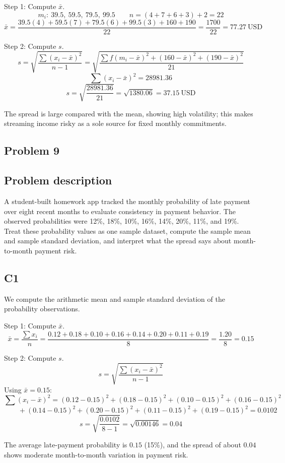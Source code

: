 \begin{ExamProblems}
		Step 1: Compute $\bar{x}$.
		\[
		m_i:\ 39.5,\ 59.5,\ 79.5,\ 99.5
		\qquad
		n = (4+7+6+3)+2 = 22
		\]
		\[
		\bar{x} = \frac{39.5(4)+59.5(7)+79.5(6)+99.5(3)+160+190}{22}
		= \frac{1700}{22}
		= 77.27\ \text{USD}
		\]

		Step 2: Compute $s$.
		\[
		s = \sqrt{\frac{\sum (x_i-\bar{x})^2}{n-1}}
		= \sqrt{\frac{\sum f(m_i-\bar{x})^2 + (160-\bar{x})^2 + (190-\bar{x})^2}{21}}
		\]
		\[
		\sum (x_i-\bar{x})^2 = 28981.36
		\]
		\[
		s = \sqrt{\frac{28981.36}{21}} = \sqrt{1380.06} = 37.15\ \text{USD}
		\]

		The spread is large compared with the mean, showing high volatility; this makes streaming income risky as a sole source for fixed monthly commitments.

		\newpage
		\item
		\subsection*{Problem 9}
		\subsection*{Problem description}
		A student-built homework app tracked the monthly probability of late payment over eight recent months to evaluate consistency in payment behavior. The observed probabilities were 12\%, 18\%, 10\%, 16\%, 14\%, 20\%, 11\%, and 19\%. Treat these probability values as one sample dataset, compute the sample mean and sample standard deviation, and interpret what the spread says about month-to-month payment risk.

		\subsection*{C1}
		We compute the arithmetic mean and sample standard deviation of the probability observations.

		Step 1: Compute $\bar{x}$.
		\[
		\bar{x} = \frac{\sum x_i}{n}
		= \frac{0.12+0.18+0.10+0.16+0.14+0.20+0.11+0.19}{8}
		= \frac{1.20}{8}
		= 0.15
		\]

		Step 2: Compute $s$.
		\[
		s = \sqrt{\frac{\sum (x_i-\bar{x})^2}{n-1}}
		\]
		Using $\bar{x}=0.15$:
		\[
		\sum (x_i-\bar{x})^2 = (0.12-0.15)^2+(0.18-0.15)^2+(0.10-0.15)^2+(0.16-0.15)^2
		\]
		\[
		\qquad +(0.14-0.15)^2+(0.20-0.15)^2+(0.11-0.15)^2+(0.19-0.15)^2 = 0.0102
		\]
		\[
		s = \sqrt{\frac{0.0102}{8-1}} = \sqrt{0.00146} = 0.04
		\]

		The average late-payment probability is $0.15$ (15\%), and the spread of about $0.04$ shows moderate month-to-month variation in payment risk.


\end{ExamProblems}
